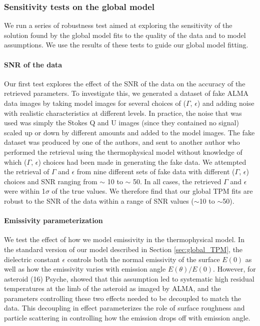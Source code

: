 \documentclass[]{aastex631}
\begin{document}
\subsubsection{Sensitivity tests on the global model}
\label{subsec:TPM_tests}

We run a series of robustness test aimed at exploring the sensitivity of the solution found by the global model fits to the quality of the data and to model assumptions. We use the results of these tests to guide our  global model fitting. 

\paragraph{SNR of the data}\label{sec:test_SNR}
Our first test explores the effect of the SNR of the data on the accuracy of the retrieved parameters. To investigate this, we generated a dataset of fake ALMA data images by taking model images for several choices of ($\Gamma$, $\epsilon$) and adding noise with realistic characteristics at different levels. In practice, the noise that was used was simply the Stokes Q and U images (since they contained no signal) scaled up or down by different amounts and added to the model images. The fake dataset was produced by one of the authors, and sent to another author who performed the retrieval using the thermophysical model without knowledge of which ($\Gamma$, $\epsilon$) choices had been made in generating the fake data. We attempted the retrieval of $\Gamma$ and $\epsilon$ from nine different sets of fake data with different ($\Gamma$, $\epsilon$) choices and SNR ranging from $\sim$ 10 to $\sim$ 50. In all cases, the retrieved $\Gamma$ and $\epsilon$ were within 1$\sigma$ of the true values. We therefore find that our global TPM fits are robust to the SNR of the data within a range of SNR values ($\sim$10 to $\sim$50).

\paragraph{Emissivity parameterization}\label{sec:emiss_test}
We test the effect of how we model emissivity in the thermophysical model. In the standard version of our model described in Section \ref{sec:global_TPM}, the dielectric constant $\epsilon$ controls both the normal emissivity of the surface $E(0)$ as well as how the emissivity varies with emission angle $E({\theta})/E({0})$. However, for asteroid (16) Psyche, \citet{dekleer2021} showed that this assumption led to systematic high residual temperatures at the limb of the asteroid as imaged by ALMA, and the parameters controlling these two effects needed to be decoupled to match the data. This decoupling in effect parameterizes the role of surface roughness and particle scattering in controlling how the emission drops off with emission angle.
\end{document}
